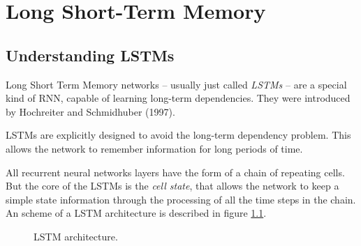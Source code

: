 
\chapter{Long Short-Term Memory} %

\label{Chapter4} %


\section{Understanding LSTMs}

Long Short Term Memory networks – usually just called \textit{LSTMs} – are a special kind of RNN, capable of learning long-term dependencies.
They were introduced by Hochreiter and Schmidhuber (1997).

LSTMs are explicitly designed to avoid the long-term dependency problem.
This allows the network to remember information for long periods of time.

All recurrent neural networks layers have the form of a chain of repeating cells.
But the core of the LSTMs is the \textit{cell state}, that allows the network to keep a simple state information through the processing of all the time steps in the chain. An scheme of a LSTM architecture is described in figure \ref{fig:lstm}.

\begin{figure}[H]
\begin{center}
\end{center}
\decoRule
\caption[LSTM architecture]{LSTM architecture.}
\label{fig:lstm}
\end{figure}

